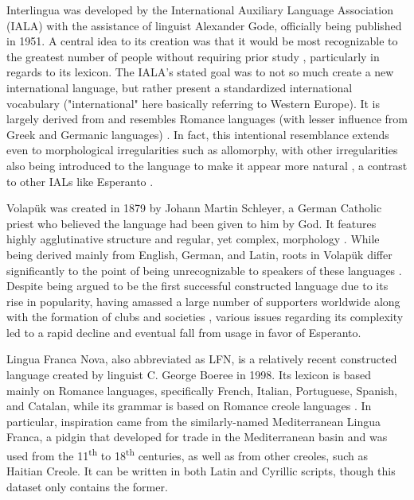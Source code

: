 \documentclass[12pt,a4paper]{article}
\numberwithin{figure}{section}
\numberwithin{table}{section}
\numberwithin{definition}{section}
\begin{document}
Interlingua was developed by the International Auxiliary Language Association (IALA) with the assistance of linguist Alexander Gode, officially being published in 1951. A central idea to its creation was that it would be most recognizable to the greatest number of people without requiring prior study \parencite{goodall2022article}, particularly in regards to its lexicon. The IALA's stated goal was to not so much create a new international language, but rather present a standardized international vocabulary \parencite{Large1985book} ("international" here basically referring to Western Europe). It is largely derived from and resembles Romance languages (with lesser influence from Greek and Germanic languages) \parencite{Schubert2001book}. In fact, this intentional resemblance extends even to morphological irregularities such as allomorphy, with other irregularities also being introduced to the language to make it appear more natural \parencite{goodall2022article}, a contrast to other IALs like Esperanto \parencite{Gobbo2016article}.

Volapük was created in 1879 by Johann Martin Schleyer, a German Catholic priest who believed the language had been given to him by God. It features highly agglutinative structure and regular, yet complex, morphology \parencite{Reagan2019book}. While being derived mainly from English, German, and Latin, roots in Volapük differ significantly to the point of being unrecognizable to speakers of these languages \parencite{goodall2022article}. Despite being argued to be the first successful constructed language due to its rise in popularity, having amassed a large number of supporters worldwide along with the formation of clubs and societies \parencite{Gobbo2016article}, various issues regarding its complexity led to a rapid decline and eventual fall from usage in favor of Esperanto.


Lingua Franca Nova, also abbreviated as LFN, is a relatively recent constructed language created by linguist C. George Boeree in 1998. Its lexicon is based mainly on Romance languages, specifically French, Italian, Portuguese, Spanish, and Catalan, while its grammar is based on Romance creole languages \parencite{Pawlas2020inbook}. In particular, inspiration came from the similarly-named Mediterranean Lingua Franca, a pidgin that developed for trade in the Mediterranean basin and was used from the 11\textsuperscript{th} to 18\textsuperscript{th} centuries, as well as from other creoles, such as Haitian Creole. It can be written in both Latin and Cyrillic scripts, though this dataset only contains the former. 
\end{document}

